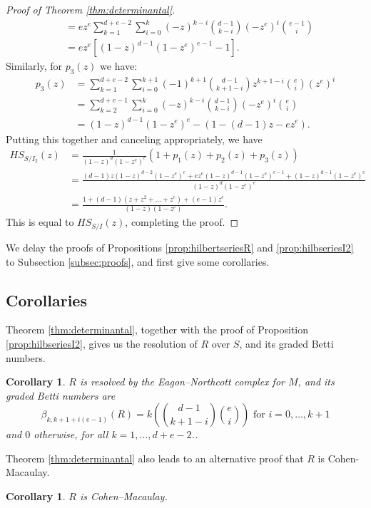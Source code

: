 \documentclass[12pt,reqno]{amsart}
\newtheorem{corollary}[theorem]{Corollary}
\theoremstyle{definition}
\theoremstyle{remark}
\begin{document}
\begin{proof}[Proof of Theorem \ref{thm:determinantal}]
\begin{align*}
&= ez^e\sum_{k=1}^{d+e-2}\sum_{i=0}^{k}(-z)^{k-i}\binom{d-1}{k-i}(-z^e)^i\binom{e-1}{i}\\
&= ez^e\left[(1-z)^{d-1}(1-z^e)^{e-1}-1\right].
\end{align*}
Similarly, for $p_3(z)$ we have:
\begin{align*}
p_3(z)&=\sum_{k=1}^{d+e-2}\sum_{i=0}^{k+1}(-1)^{k+1}\binom{d-1}{k+1-i}z^{k+1-i}\binom{e}{i}(z^e)^i\\
&= \sum_{k=2}^{d+e-1}\sum_{i=0}^{k}(-z)^{k-i}\binom{d-1}{k-i}(-z^e)^i\binom{e}{i}\\
&= (1-z)^{d-1}(1-z^e)^e - (1-(d-1)z-ez^e).
\end{align*}
Putting this together and canceling appropriately, we have
\begin{align*}
HS_{S/I_2}(z) &= \frac{1}{(1-z)^d(1-z^e)^e}\left( 1+p_1(z)+p_2(z)+p_3(z)\right)\\
&=\frac{(d-1)z(1-z)^{d-2}(1-z^e)^e+ez^e(1-z)^{d-1}(1-z^e)^{e-1}+ (1-z)^{d-1}(1-z^e)^e}{(1-z)^d(1-z^e)^e}\\
&= \frac{1+(d-1)(z+z^2+\ldots+z^e)+(e-1)z^e}{(1-z)(1-z^e)}.
\end{align*}
This is equal to $HS_{S/I}(z)$, completing the proof.
\end{proof}

We delay the proofs of Propositions \ref{prop:hilbertseriesR} and \ref{prop:hilbseriesI2} to Subsection \ref{subsec:proofs}, and first give some corollaries.

\subsection{Corollaries}
\label{subsec:corollaries}

Theorem \ref{thm:determinantal}, together with the proof of Proposition \ref{prop:hilbseriesI2}, gives us the resolution of $R$ over $S$, and its graded Betti numbers.

\begin{corollary}\label{cor:eagonnorthcott}
$R$ is resolved by the Eagon--Northcott complex for $M$, and its graded Betti numbers are 
\[
\beta_{k,k+1+i(e-1)}(R) = k \left( \binom{d-1}{k+1-i} \binom{e}{i}\right) \text{ for } i = 0, \ldots, k+1
\]
and $0$ otherwise, for all $k=1, \ldots, d+e-2$.. 
\end{corollary}

Theorem \ref{thm:determinantal} also leads to an alternative proof that $R$ is Cohen-Macaulay.

\begin{corollary}
\label{cor:alternateCohenMacaulay}
$R$ is Cohen--Macaulay.
\end{corollary}
\end{document}
